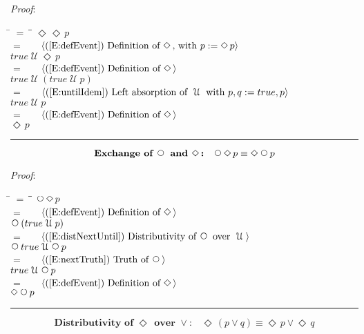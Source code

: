 \documentclass[12pt, fleqn, leqno]{article}
\newcommand{\lgap}{2pt}                             %
\newcommand{\mymathindent}{24pt}                    %
\newcommand{\Until}{\;\mathcal{U}\;}
\newcommand{\Next}{\;\,\text{\raisebox{3.5pt}{\circle{6}}}}
\newcommand{\Event}{\Diamond\,}
\newcommand{\myqed}{\rule[-.23ex]{1.2ex}{2.0ex}}
\newcommand{\myqedtab}{\hspace{384pt}}              %
\newcommand{\Gll} {\langle}                         %
\newcommand{\Ggg} {\rangle}                         %
\newcommand{\Hint}[1]     {\ \ \ $\Gll              \mbox{#1} \Ggg$ }   %
\begin{document}
\emph{Proof}:
\begin{tabbing}
\hspace{\mymathindent} \= $= \;$ \= \myqedtab \= \kill
  \> \>   $\Event\Event p$\\[\lgap]
  \> $=$  \>  \Hint{(\ref{E:defEvent}) Definition of $\Event$, with $p := \Event p$}\\[\lgap]
  \> \>   $true \Until \Event p$\\[\lgap]
  \> $=$  \>  \Hint{(\ref{E:defEvent}) Definition of $\Event$}\\[\lgap]
  \> \>   $true \Until (true \Until p)$\\[\lgap]
  \> $=$  \>  \Hint{(\ref{E:untilIdem}) Left absorption of $\Until$ with $p,q := true,p$}\\[\lgap]
  \> \>   $true \Until p$\\[\lgap]
  \> $=$  \>  \Hint{(\ref{E:defEvent}) Definition of $\Event$}\\[\lgap]
  \> \>   $\Event p$ \quad \myqed
\end{tabbing}
\begin{equation}\label{E:dNextEvent}
\textbf{Exchange of $\Next$ and $\Event$:}\quad \Next\Event p \equiv \Event\Next p
\end{equation}

\emph{Proof}:
\begin{tabbing}
\hspace{\mymathindent} \= $= \;$ \= \myqedtab \= \kill
  \> \>   $\Next\Event p$\\[\lgap]
  \> $=$  \>  \Hint{(\ref{E:defEvent}) Definition of $\Event$}\\[\lgap]
  \> \>   $\Next(true \Until p)$\\[\lgap]
  \> $=$  \>  \Hint{(\ref{E:distNextUntil}) Distributivity of $\Next$ over $\Until$}\\[\lgap]
  \> \>   $\Next true \Until \Next p$\\[\lgap]
  \> $=$  \>  \Hint{(\ref{E:nextTruth}) Truth of $\Next$}\\[\lgap]
  \> \>   $true \Until \Next p$\\[\lgap]
  \> $=$  \>  \Hint{(\ref{E:defEvent}) Definition of $\Event$}\\[\lgap]
  \> \>   $\Event\Next p$ \quad \myqed
\end{tabbing}
\begin{equation}\label{E:distEventOr}
\textbf{Distributivity of $\Event$ over $\lor$:}\quad \Event(p \lor q) \equiv \Event p \lor \Event q
\end{equation}
\end{document}

